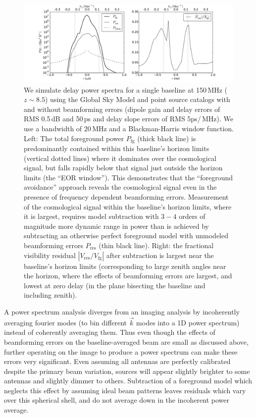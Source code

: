 \begin{figure}[t]
\includegraphics[width=7in]{chap2_beamforming_errors/bf_errors_in_visibilities.pdf}
\caption[Simulations of the effects of beamforming errors on foreground subtraction and avoidance techniques for a single baseline analysis.]{We simulate delay power spectra for a single baseline at 150\,MHz ($z\sim8.5$) using the Global Sky Model and point source catalogs with and without beamforming errors (dipole gain and delay errors of RMS 0.5\,dB and 50\,ps and delay slope errors of RMS 5ps/\,MHz). We use a bandwidth of 20\,MHz and a Blackman-Harris window function. Left: The total foreground power $P_\mathrm{fg}$ (thick black line) is predominantly contained within this baseline's horizon limits (vertical dotted lines) where it dominates over the cosmological signal, but falls rapidly below that signal just outside the horizon limits (the ``EOR window''). This demonstrates that the ``foreground avoidance'' approach reveals the cosmological signal even in the presence of frequency dependent beamforming errors. Measurement of the cosmological signal within the baseline's horizon limits, where it is largest, requires model subtraction with $3-4$ orders of magnitude more dynamic range in power than is achieved by subtracting an otherwise perfect foreground model with unmodeled beamforming errors $P_\mathrm{res}$ (thin black line). Right: the fractional visibility residual $|V_\mathrm{res}/V_\mathrm{fg}|$ after subtraction is largest near the baseline's horizon limits (corresponding to large zenith angles near the horizon, where the effects of beamforming errors are largest, and lowest at zero delay (in the plane bisecting the baseline and including zenith). }
\label{fig:bferrorsinps}
\end{figure}


A power spectrum analysis diverges from an imaging analysis by incoherently averaging fourier modes (to bin different $\vec{k}$ modes into a 1D power spectrum) instead of coherently averaging them. Thus even though the effects of beamforming errors on the baseline-averaged beam are small as discussed above, further operating on the image to produce a power spectrum can make these errors very significant. Even assuming all antennas are perfectly calibrated despite the primary beam variation, sources will appear slightly brighter to some antennas and slightly dimmer to others. Subtraction of a foreground model which neglects this effect by assuming ideal beam patterns leaves residuals which vary over this spherical shell, and do not average down in the incoherent power average. 

